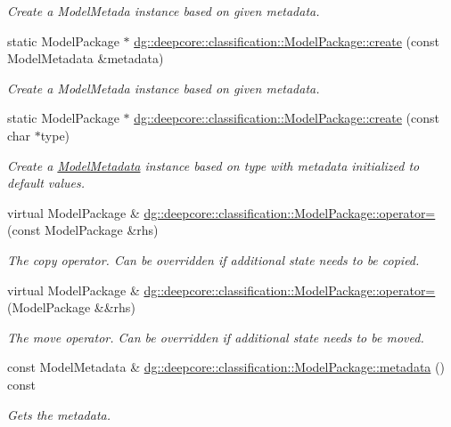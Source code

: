 \begin{DoxyCompactItemize}
\begin{DoxyCompactList}\small\item\em Create a Model\+Metada instance based on given metadata. \end{DoxyCompactList}\item 
static Model\+Package $\ast$ \hyperlink{group___classification_module_gaa4bb1ba1156829db5249f2583da252d6}{dg\+::deepcore\+::classification\+::\+Model\+Package\+::create} (const Model\+Metadata \&metadata)
\begin{DoxyCompactList}\small\item\em Create a Model\+Metada instance based on given metadata. \end{DoxyCompactList}\item 
static Model\+Package $\ast$ \hyperlink{group___classification_module_ga37d9fd1a7c8847139c5e6663c258f377}{dg\+::deepcore\+::classification\+::\+Model\+Package\+::create} (const char $\ast$type)
\begin{DoxyCompactList}\small\item\em Create a \hyperlink{classdg_1_1deepcore_1_1classification_1_1_model_metadata}{Model\+Metadata} instance based on type with metadata initialized to default values. \end{DoxyCompactList}\item 
virtual Model\+Package \& \hyperlink{group___classification_module_gac73fbbe8aca7bc1f27507c471939a0e7}{dg\+::deepcore\+::classification\+::\+Model\+Package\+::operator=} (const Model\+Package \&rhs)
\begin{DoxyCompactList}\small\item\em The copy operator. Can be overridden if additional state needs to be copied. \end{DoxyCompactList}\item 
virtual Model\+Package \& \hyperlink{group___classification_module_ga20bc12c1bba9457962b58f993a2106b4}{dg\+::deepcore\+::classification\+::\+Model\+Package\+::operator=} (Model\+Package \&\&rhs)
\begin{DoxyCompactList}\small\item\em The move operator. Can be overridden if additional state needs to be moved. \end{DoxyCompactList}\item 
const Model\+Metadata \& \hyperlink{group___classification_module_gaa88957807aa9cd63108033b376e60ef2}{dg\+::deepcore\+::classification\+::\+Model\+Package\+::metadata} () const 
\begin{DoxyCompactList}\small\item\em Gets the metadata. \end{DoxyCompactList}\item 

\end{DoxyCompactItemize}
